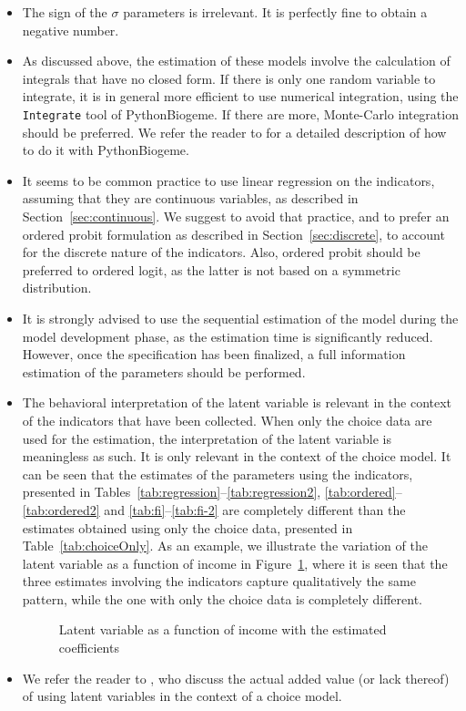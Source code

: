 \documentclass[12pt,a4paper]{article}
\newcommand{\PBIOGEME}{PythonBiogeme}
\begin{document}
\begin{itemize}
\item The sign of the $\sigma$ parameters is irrelevant. It is
  perfectly fine to obtain a negative number. 
\item As discussed above, the estimation of these models involve the
  calculation of integrals that have no closed form. If there is only
  one random variable to integrate, it is in general more efficient to
  use numerical integration, using the \lstinline$Integrate$ tool of
  \PBIOGEME. If there are more, Monte-Carlo integration should be
  preferred. We refer the reader to  for a detailed
  description of how to do it with \PBIOGEME.
\item It seems to be common practice to use linear regression on the
  indicators, assuming that they are continuous variables, as
  described in Section~\ref{sec:continuous}. We suggest
  to avoid that practice, and to prefer an ordered probit formulation as
  described in Section~\ref{sec:discrete}, to account for the discrete nature of
  the indicators. Also, ordered probit should be preferred to ordered
  logit, as the latter is not based on a symmetric
  distribution. 
\item It is strongly advised to use the sequential estimation of the
  model during the model development phase, as the estimation time is
  significantly reduced. However, once
  the specification has been finalized, a full information estimation
  of the parameters should be performed.
\item The behavioral interpretation of the latent variable is relevant
  in the context of the indicators that have been collected. When only
  the choice data are used for the estimation, the interpretation of
  the latent variable  is meaningless as such. It is only
  relevant in the context of the choice model. It can be seen that the
  estimates of the parameters using the indicators, presented in
  Tables~\ref{tab:regression}--\ref{tab:regression2},
  \ref{tab:ordered}--\ref{tab:ordered2} and \ref{tab:fi}--\ref{tab:fi-2} are completely
  different than the estimates obtained using only the choice data,
  presented in Table~\ref{tab:choiceOnly}. As an example, we
  illustrate the variation of the latent variable as a function of
  income in Figure~\ref{fig:piecewiseIncome}, where it is seen that
  the three estimates involving the indicators capture qualitatively
  the same pattern, while the one with only the choice data is
  completely different. 

\begin{figure}[htb]

\caption{\label{fig:piecewiseIncome}Latent variable as a function of
  income with the estimated coefficients}
\end{figure}

\item We refer the reader to , who discuss the actual
  added value (or lack thereof) of using latent variables in the
  context of a choice   model. 

\end{itemize}
\end{document}
